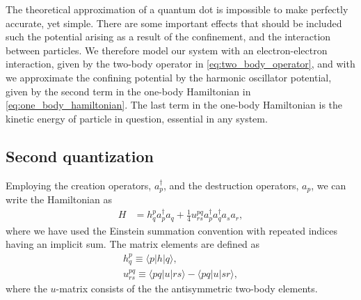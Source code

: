 \documentclass[
    a4paper, aps, twocolumn, floatfix, superscriptaddress,
    nofootinbib]{revtex4-1}
\newcommand{\1}{\mathds{1}}
\newcommand{\bra}[1]{\langle #1\lvert}
\newcommand{\ket}[1]{\rvert #1\rangle}
\newcommand{\acr}[1]{a_{#1}^{\dagger}}
\newcommand{\ade}[1]{a_{#1}}
\begin{document}
        The theoretical approximation of a quantum dot is impossible to make
        perfectly accurate, yet simple. There are some important effects that
        should be included such the potential arising as a result of the
        confinement, and the interaction between particles. We therefore model
        our system with an electron-electron interaction, given by the two-body
        operator in \autoref{eq:two_body_operator}, and with we approximate the
        confining potential by the harmonic oscillator potential, given by the
        second term in the one-body Hamiltonian in
        \autoref{eq:one_body_hamiltonian}. The last term in the one-body
        Hamiltonian is the kinetic energy of particle in question, essential in
        any system.

    \subsection{Second quantization}
        Employing the creation operators, $\acr{p}$, and the destruction
        operators, $\ade{p}$, we can write the Hamiltonian as
        \begin{align}
            H
            &=
            h_{q}^{p}\acr{p}\ade{q}
            + \frac{1}{4}u^{pq}_{rs}
            \acr{p}\acr{q}\ade{s}\ade{r},
        \end{align}
        where we have used the Einstein summation convention with repeated
        indices having an implicit sum. The matrix elements are defined as
        \begin{gather}
            h^{p}_{q} \equiv \bra{p}h\ket{q}, \\
            u^{pq}_{rs} \equiv \bra{pq}u\ket{rs} - \bra{pq}u\ket{sr},
        \end{gather}
        where the $u$-matrix consists of the the antisymmetric two-body
        elements.
\end{document}

